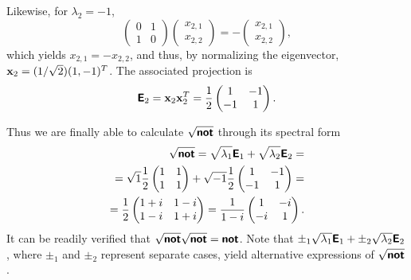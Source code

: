 {Likewise, for $\lambda_2=-1$,
\begin{equation}
\begin{pmatrix}
 0&1\\  1&0
\end{pmatrix}
\begin{pmatrix}
x_{2,1}\\x_{2,2}
\end{pmatrix}
=-\begin{pmatrix}
x_{2,1}\\x_{2,2}
\end{pmatrix}
,
\end{equation}
which yields  $x_{2,1}=-x_{2,2}$, and thus, by normalizing the eigenvector,
${\bf x}_2=(1/\sqrt{2})(1,-1)^T$.
The associated projection is
\begin{equation}
\textsf{\textbf{E}}_2={\bf x}_2{\bf x}_2^T=\frac{1}{2}
\begin{pmatrix}
 1&-1\\  -1&1
\end{pmatrix}
.
\end{equation}

Thus we are finally able to calculate
$\sqrt{\textsf{\textbf{not}}}$
through its spectral form
\begin{equation}
\begin{split}
\sqrt{\textsf{\textbf{not}}}=
\sqrt{\lambda_1}\textsf{\textbf{E}}_1 +
\sqrt{\lambda_2}\textsf{\textbf{E}}_2
=
\\=  \sqrt{1}
\frac{1}{2} \begin{pmatrix}
 1&1\\  1&1
\end{pmatrix}
+  \sqrt{-1}
\frac{1}{2} \begin{pmatrix}
 1&-1\\  -1&1
\end{pmatrix}
=
\\
=
\frac{1}{2}
\begin{pmatrix}
 1+i&1-i\\  1-i&1+i
\end{pmatrix}
=
\frac{1}{1-i}
\begin{pmatrix}
 1&-i\\  -i&1
\end{pmatrix}
.
\end{split}
\end{equation}
It can be readily verified that  $\sqrt{\textsf{\textbf{not}}}\sqrt{\textsf{\textbf{not}}}=\textsf{\textbf{not}}$.
Note that
$\pm_1 \sqrt{\lambda_1}\textsf{\textbf{E}}_1 +
\pm_2 \sqrt{\lambda_2}\textsf{\textbf{E}}_2$, where $\pm_1$ and $\pm_2$ represent separate cases,
yield alternative expressions of $\sqrt{\textsf{\textbf{not}}}$.



\eexample
}

